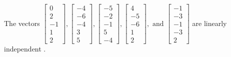 \begin{exercise}
\begin{exerciseStatement}
  \end{exerciseStatement}
  \begin{exerciseAnswer}
   The vectors \(\left[\begin{array}{r}
0 \\
2 \\
-1 \\
1 \\
2
\end{array}\right] , \left[\begin{array}{r}
-4 \\
-6 \\
-4 \\
3 \\
5
\end{array}\right] , \left[\begin{array}{r}
-5 \\
-2 \\
-1 \\
5 \\
-4
\end{array}\right] , \left[\begin{array}{r}
4 \\
-5 \\
-6 \\
1 \\
2
\end{array}\right] , \text{ and } \left[\begin{array}{r}
-1 \\
-3 \\
-1 \\
-3 \\
2
\end{array}\right]\) are 
  	 linearly independent  .
  


  \end{exerciseAnswer}
\end{exercise}